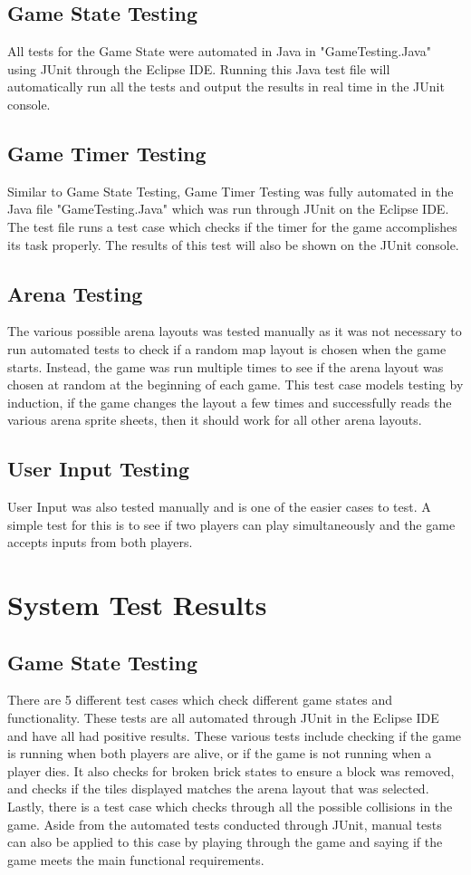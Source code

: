 \documentclass[12pt, letterpaper]{article}
\begin{document}
\subsection{Game State Testing}
\indent \indent All tests for the Game State were automated in Java in "GameTesting.Java" using JUnit through the Eclipse IDE. Running this Java test file will automatically run all the tests and output the results in real time in the JUnit console.
\subsection{Game Timer Testing}
\indent \indent Similar to Game State Testing, Game Timer Testing was fully automated in the Java file "GameTesting.Java" which was run through JUnit on the Eclipse IDE. The test file runs a test case which checks if the timer for the game accomplishes its task properly. The results of this test will also be shown on the JUnit console.
\subsection{Arena Testing}
\indent \indent The various possible arena layouts was tested manually as it was not necessary to run automated tests to check if a random map layout is chosen when the game starts. Instead, the game was run multiple times to see if the arena layout was chosen at random at the beginning of each game. This test case models testing by induction, if the game changes the layout a few times and successfully reads the various arena sprite sheets, then it should work for all other arena layouts.
\subsection{User Input Testing}
\indent \indent User Input was also tested manually and is one of the easier cases to test. A simple test for this is to see if two players can play simultaneously and the game accepts inputs from both players.

\section{System Test Results}
\subsection{Game State Testing}
\indent \indent There are 5 different test cases which check different game states and functionality. These tests are all automated through JUnit in the Eclipse IDE and have all had positive results. These various tests include checking if the game is running when both players are alive, or if the game is not running when a player dies. It also checks for broken brick states to ensure a block was removed, and checks if the tiles displayed matches the arena layout that was selected. Lastly, there is a test case which checks through all the possible collisions in the game. Aside from the automated tests conducted through JUnit, manual tests can also be applied to this case by playing through the game and saying if the game meets the main functional requirements.
\end{document}
